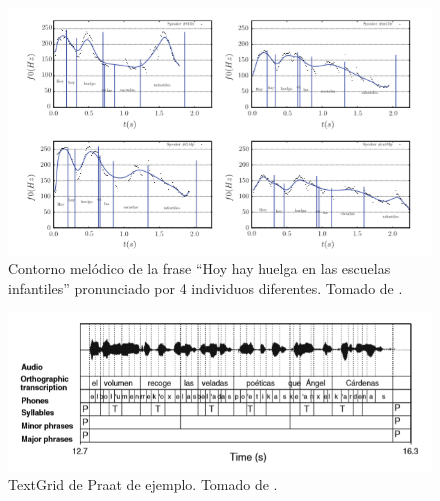 \begin{figure}
\begin{center}
\includegraphics[width= 1\columnwidth]{Graphics/diferencialocutor}
\caption{Contorno mel\'odico de la frase ``Hoy hay huelga en las escuelas infantiles'' pronunciado por 4 individuos diferentes. Tomado de \cite[p.966]{garrido2013glissando}.}
\label{diferencialocutor}
\end{center}
\end{figure}


\begin{figure}
\begin{center}
\includegraphics[width= 1\columnwidth]{Graphics/textgrid}
\caption{TextGrid de Praat de ejemplo. Tomado de \cite[p.962]{garrido2013glissando}.}
\label{textgrid}
\end{center}
\end{figure}


